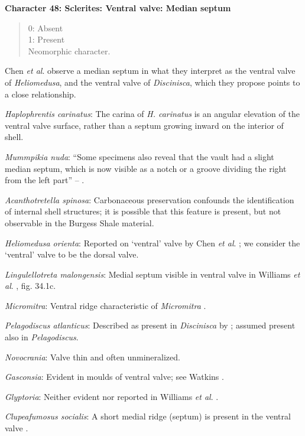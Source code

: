 \documentclass[]{book}
\theoremstyle{definition}
\theoremstyle{definition}
\theoremstyle{definition}
\theoremstyle{remark}
\begin{document}
\textbf{Character 48: Sclerites: Ventral valve: Median septum}

\begin{quote}
0: Absent\\
1: Present\\
Neomorphic character.
\end{quote}

Chen \emph{et al}. \citeyearpar{Chen2007Reinterpretationof} observe a
median septum in what they interpret as the ventral valve of
\emph{Heliomedusa}, and the ventral valve of \emph{Discinisca}, which
they propose points to a close relationship.

\emph{Haplophrentis carinatus}: The carina of \emph{H. carinatus} is an
angular elevation of the ventral valve surface, rather than a septum
growing inward on the interior of shell.

\emph{Mummpikia nuda}: ``Some specimens also reveal that the vault had a
slight median septum, which is now visible as a notch or a groove
dividing the right from the left part'' --
\citet{Balthasar2008iMummpikia}.

\emph{Acanthotretella spinosa}: Carbonaceous preservation confounds the
identification of internal shell structures; it is possible that this
feature is present, but not observable in the Burgess Shale material.

\emph{Heliomedusa orienta}: Reported on `ventral' valve by Chen \emph{et
al}. \citeyearpar{Chen2007Reinterpretationof}; we consider the `ventral'
valve to be the dorsal valve.

\emph{Lingulellotreta malongensis}: Medial septum visible in ventral
valve in Williams \emph{et al}.
\citeyearpar{Williams2000BrachiopodaLinguliformea}, fig. 34.1c.

\emph{Micromitra}: Ventral ridge characteristic of \emph{Micromitra}
\citep{Skovsted2010EarlyCambrian}.

\emph{Pelagodiscus atlanticus}: Described as present in
\emph{Discinisca} by \citet{Chen2007Reinterpretationof}; assumed present
also in \emph{Pelagodiscus}.

\emph{Novocrania}: Valve thin and often unmineralized.

\emph{Gasconsia}: Evident in moulds of ventral valve; see Watkins
\citeyearpar{Watkins2002Newrecord}.

\emph{Glyptoria}: Neither evident nor reported in Williams \emph{et al}.
\citeyearpar{Williams2000BrachiopodaLinguliformea}.

\emph{Clupeafumosus socialis}: A short medial ridge (septum) is present
in the ventral valve \citep{Topper2013Reappraisalof}.
\end{document}
